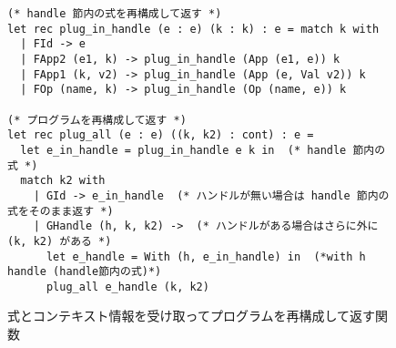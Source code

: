 \begin{figure}
\begin{spacing}{0.9} 
\begin{verbatim}
(* handle 節内の式を再構成して返す *)
let rec plug_in_handle (e : e) (k : k) : e = match k with
  | FId -> e
  | FApp2 (e1, k) -> plug_in_handle (App (e1, e)) k
  | FApp1 (k, v2) -> plug_in_handle (App (e, Val v2)) k
  | FOp (name, k) -> plug_in_handle (Op (name, e)) k

(* プログラムを再構成して返す *)
let rec plug_all (e : e) ((k, k2) : cont) : e =
  let e_in_handle = plug_in_handle e k in  (* handle 節内の式 *)
  match k2 with
    | GId -> e_in_handle  (* ハンドルが無い場合は handle 節内の式をそのまま返す *)
    | GHandle (h, k, k2) ->  (* ハンドルがある場合はさらに外に (k, k2) がある *)
      let e_handle = With (h, e_in_handle) in  (*with h handle (handle節内の式)*)
      plug_all e_handle (k, k2)
\end{verbatim}
\caption{式とコンテキスト情報を受け取ってプログラムを再構成して返す関数}
\label{figure:plug_all}
\end{spacing}
\end{figure}

